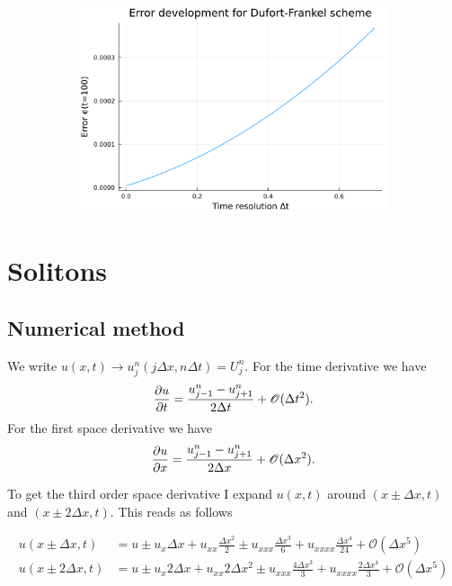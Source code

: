 \documentclass[
	a4paper, %
	10pt, %
]{CSUniSchoolLabReport}
\begin{document}
\begin{figure}[H]
\begin{subfigure}[b]{0.49\textwidth}
	\end{subfigure}
	\hfill
	\begin{subfigure}[b]{0.49\textwidth}
		\includegraphics[width=\textwidth]{../saves_t2/error_development_df.pdf}
	\end{subfigure}
	\hfill
	\caption{}
	\label{fig:all_trunc_errors}
\end{figure}


\section{Solitons}

\subsection{Numerical method}

We write $u(x,t)\rightarrow u_{j}^n (j\Delta x, n\Delta t) = U_j^n$. For the time derivative we have 
\begin{align}
	\pdv{u}{t} = \frac{u_{j-1}^n-u_{j+1}^n}{2\Delta t} + \mathscr{O}(\Delta t^2).
\end{align}
For the first space derivative we have
\begin{align}
	\pdv{u}{x} = \frac{u_{j-1}^n-u_{j+1}^n}{2\Delta x}+ \mathscr{O}(\Delta x^2).
\end{align}

To get the third order space derivative I expand $u(x,t)$ around $(x\pm\Delta x, t)$ and $(x\pm 2\Delta x, t)$. This reads as follows

\begin{align*}
	u(x\pm\Delta x, t) &= u \pm u_{x} \Delta x + u_{xx} \frac{\Delta x^2}{2}\pm u_{xxx} \frac{\Delta x^3}{6} + u_{xxxx}\frac{\Delta x^4}{24} + \mathscr{O}(\Delta x^5) \\
	u(x\pm 2\Delta x, t) &= u \pm u_{x} 2\Delta x + u_{xx} 2 \Delta x^2\pm u_{xxx} \frac{4\Delta x^3}{3} + u_{xxxx}\frac{2\Delta x^4}{3} + \mathscr{O}(\Delta x^5)
\end{align*}
\end{document}
